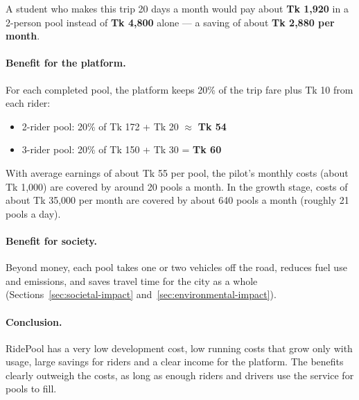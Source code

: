 A student who makes this trip 20 days a month would pay about
\textbf{Tk 1,920} in a 2-person pool instead of \textbf{Tk 4,800} alone --- a
saving of about \textbf{Tk 2,880 per month}.

\paragraph{Benefit for the platform.}
For each completed pool, the platform keeps 20\% of the trip fare plus Tk 10
from each rider:

\begin{itemize}
  \item 2-rider pool: 20\% of Tk 172 + Tk 20 $\approx$ \textbf{Tk 54}
  \item 3-rider pool: 20\% of Tk 150 + Tk 30 = \textbf{Tk 60}
\end{itemize}

With average earnings of about Tk 55 per pool, the pilot's monthly costs
(about Tk 1,000) are covered by around 20 pools a month. In the growth stage,
costs of about Tk 35,000 per month are covered by about 640 pools a month
(roughly 21 pools a day).

\paragraph{Benefit for society.}
Beyond money, each pool takes one or two vehicles off the road, reduces fuel
use and emissions, and saves travel time for the city as a whole
(Sections~\ref{sec:societal-impact} and~\ref{sec:environmental-impact}).

\paragraph{Conclusion.}
RidePool has a very low development cost, low running costs that grow only
with usage, large savings for riders and a clear income for the platform. The
benefits clearly outweigh the costs, as long as enough riders and drivers use
the service for pools to fill.
